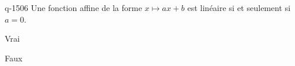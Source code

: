 \begin{truefalse}{q-1506}
Une fonction affine de la forme  $x\mapsto ax+b$ est linéaire si et seulement si $a=0$.
\item Vrai
\item* Faux
\end{truefalse}

